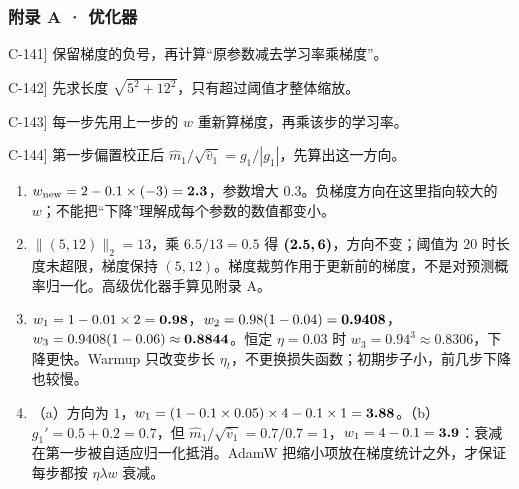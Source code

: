 \subsubsection*{附录 A · 优化器}
\begin{answerhints}
\item[\hyperref[exercise:optimizer-basic-step]{C-141}] \leavevmode{}\label{hint:optimizer-basic-step}保留梯度的负号，再计算“原参数减去学习率乘梯度”。
\item[\hyperref[exercise:optimizer-clipping]{C-142}] \leavevmode{}\label{hint:optimizer-clipping}先求长度 $\sqrt{5^2+12^2}$，只有超过阈值才整体缩放。
\item[\hyperref[exercise:optimizer-warmup]{C-143}] \leavevmode{}\label{hint:optimizer-warmup}每一步先用上一步的 $w$ 重新算梯度，再乘该步的学习率。
\item[\hyperref[exercise:optimizer-adamw]{C-144}] \leavevmode{}\label{hint:optimizer-adamw}第一步偏置校正后 $\widehat{m}_1/\sqrt{\widehat{v}_1}=g_1/|g_1|$，先算出这一方向。
\end{answerhints}
\begin{enumerate}[label={},leftmargin=4.8em,itemsep=4pt]
\item[\textbf{\hyperref[exercise:optimizer-basic-step]{C-141.}}] \leavevmode{}\label{solution:C-141}\label{solution:optimizer-basic-step}$w_{\rm new}=2-0.1\times(-3)=\boldsymbol{2.3}$，参数增大 $0.3$。负梯度方向在这里指向较大的 $w$；不能把“下降”理解成每个参数的数值都变小。
\item[\textbf{\hyperref[exercise:optimizer-clipping]{C-142.}}] \leavevmode{}\label{solution:C-142}\label{solution:optimizer-clipping}$\|(5,12)\|_2=13$，乘 $6.5/13=0.5$ 得 $\boldsymbol{(2.5,6)}$，方向不变；阈值为 $20$ 时长度未超限，梯度保持 $(5,12)$。梯度裁剪作用于更新前的梯度，不是对预测概率归一化。高级优化器手算见附录 A。
\item[\textbf{\hyperref[exercise:optimizer-warmup]{C-143.}}] \leavevmode{}\label{solution:C-143}\label{solution:optimizer-warmup}$w_1=1-0.01\times2=\boldsymbol{0.98}$，$w_2=0.98(1-0.04)=\boldsymbol{0.9408}$，$w_3=0.9408(1-0.06)\approx\boldsymbol{0.8844}$。恒定 $\eta=0.03$ 时 $w_3=0.94^3\approx0.8306$，下降更快。Warmup 只改变步长 $\eta_t$，不更换损失函数；初期步子小，前几步下降也较慢。
\item[\textbf{\hyperref[exercise:optimizer-adamw]{C-144.}}] \leavevmode{}\label{solution:C-144}\label{solution:optimizer-adamw}（a）方向为 $1$，$w_1=(1-0.1\times0.05)\times4-0.1\times1=\boldsymbol{3.88}$。（b）$g_1'=0.5+0.2=0.7$，但 $\widehat{m}_1/\sqrt{\widehat{v}_1}=0.7/0.7=1$，$w_1=4-0.1=\boldsymbol{3.9}$：衰减在第一步被自适应归一化抵消。AdamW 把缩小项放在梯度统计之外，才保证每步都按 $\eta\lambda w$ 衰减。
\end{enumerate}
